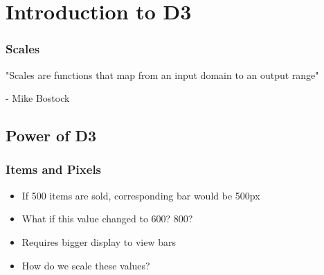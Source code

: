 \documentclass[red]{beamer}
\begin{document}


\begin{frame}
  \titlepage
\end{frame}

\section[Outline]{}

\section{Introduction to D3}

\begin{frame}
    \frametitle{Scales}
    "Scales are functions that map from an input domain to an output range"

    \hspace{0.9cm} - Mike Bostock 
\end{frame}


\subsection{Power of D3}

\begin{frame}
  \frametitle{Items and Pixels}   %
  \lstl

  \begin{itemize}
  \item<1-> If 500 items are sold, corresponding bar would be 500px
  \item<2-> What if this value changed to 600? 800?
  \item<3-> Requires bigger display to view bars
  \item<4-> How do we scale these values?
  \end{itemize}
\end{frame}
\end{document}
